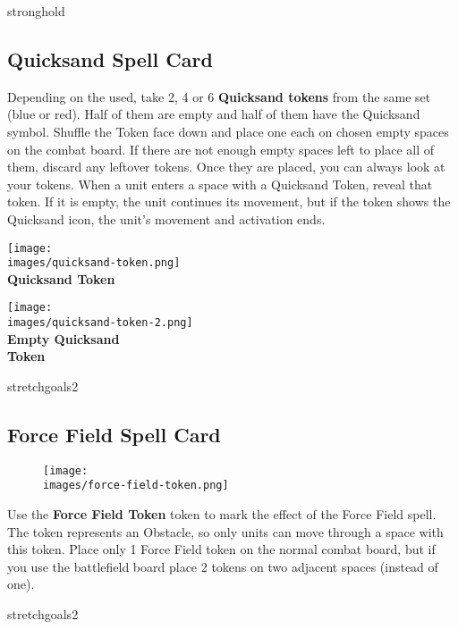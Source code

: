 \begin{multicols*}{2}
\begin{expansion}{stronghold}
	\subsection*{Quicksand Spell Card}
	Depending on the  used, take 2, 4 or 6 \textbf{Quicksand tokens} from the same set  (blue or red).
  Half of them are empty and half of them have the Quicksand symbol.
  Shuffle the Token face down and place one each on chosen empty spaces on the combat board.
  If there are not enough empty spaces left to place all of them, discard any leftover tokens.
  Once they are placed, you can always look at your tokens.
  When a unit enters a space with a Quicksand Token, reveal that token.
  If it is empty, the unit continues its movement, but if the token shows the Quicksand icon, the unit's movement and activation ends.
  \bigskip
  \begin{multicols*}{2}
    \centering
    \texttt{[image: \\images/quicksand-token.png]}\\
    \textbf{\scriptsize\color{darkcandyapplered}Quicksand Token\\}

    \columnbreak
    \texttt{[image: \\images/quicksand-token-2.png]}\\
    \textbf{\scriptsize\color{darkcandyapplered}Empty Quicksand\\Token}
  \end{multicols*}
\end{expansion}
\vspace*{1em}
\begin{expansion}{stretchgoals2}
	\subsection*{Force Field Spell Card}
  \setlength\intextsep{0pt}
  \setlength\columnsep{1em}
  \begin{wrapfigure}{r}{0.2\linewidth}
		\texttt{[image: \\images/force-field-token.png]}
  \end{wrapfigure}
	Use the \textbf{Force Field Token} token to mark the effect of the Force Field spell.
  The token represents an Obstacle, so only  units can move through a space with this token.
  Place only 1 Force Field token on the normal combat board, but if you use the battlefield board place 2 tokens on two adjacent spaces (instead of one).
\end{expansion}
\vspace*{1em}
\begin{expansion}{stretchgoals2}

\end{expansion}
\end{multicols*}
